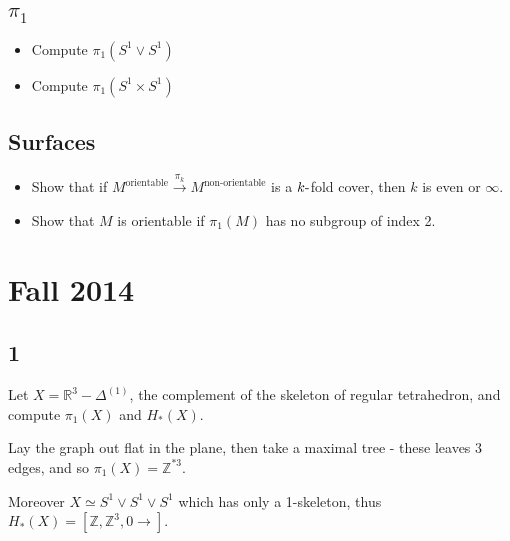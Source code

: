 \hypertarget{pi_1}{%
\subsection{\texorpdfstring{\(\pi_1\)}{\textbackslash pi\_1}}\label{pi_1}}

\begin{itemize}
\tightlist
\item
  Compute \(\pi_1(S^1 \vee S^1)\)
\item
  Compute \(\pi_1(S^1 \times S^1)\)
\end{itemize}

\hypertarget{surfaces}{%
\subsection{Surfaces}\label{surfaces}}

\begin{itemize}
\tightlist
\item
  Show that if
  \(M^\text{orientable} \xrightarrow{\pi_k} M^\text{non-orientable}\) is
  a \(k{\hbox{-}}\)fold cover, then \(k\) is even or \(\infty\).
\item
  Show that \(M\) is orientable if \(\pi_1(M)\) has no subgroup of index
  2.
\end{itemize}

\hypertarget{fall-2014}{%
\section{Fall 2014}\label{fall-2014}}

\hypertarget{section}{%
\subsection{1}\label{section}}

Let \(X = {\mathbb{R}}^3 - \Delta^{(1)}\), the complement of the
skeleton of regular tetrahedron, and compute \(\pi_1(X)\) and
\(H_*(X)\).

\begin{solution}

Lay the graph out flat in the plane, then take a maximal tree - these
leaves 3 edges, and so \(\pi_1(X) = {\mathbb{Z}}^{\ast 3}\).

Moreover \(X \simeq S^1\vee S^1 \vee S^1\) which has only a 1-skeleton,
thus \(H_*(X) = [{\mathbb{Z}}, {\mathbb{Z}}^3, 0\rightarrow]\).

\end{solution}

